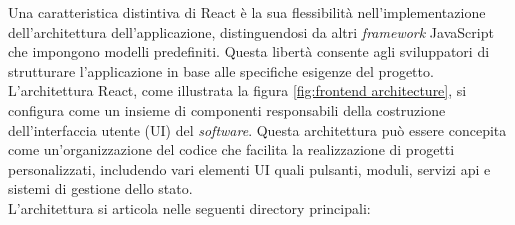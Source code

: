 Una caratteristica distintiva di React è la sua flessibilità nell'implementazione dell'architettura dell'applicazione, 
distinguendosi da altri \textit{framework} JavaScript che impongono modelli predefiniti. Questa libertà consente 
agli sviluppatori di strutturare l'applicazione in base alle specifiche esigenze del progetto.\\
L'architettura React, come illustrata la figura \ref{fig:frontend architecture}, si configura come un insieme di 
componenti responsabili della costruzione dell'interfaccia utente (UI) del \textit{software}. Questa architettura 
può essere concepita come un'organizzazione del codice che facilita la realizzazione di progetti personalizzati, 
includendo vari elementi UI quali pulsanti, moduli, servizi \gls{api} e sistemi di gestione dello stato.\\
L'architettura si articola nelle seguenti directory principali:

